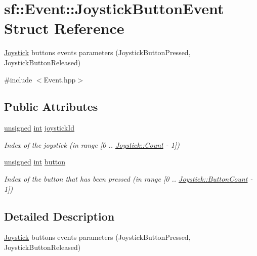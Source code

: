 \hypertarget{structsf_1_1_event_1_1_joystick_button_event}{\section{sf\-:\-:Event\-:\-:Joystick\-Button\-Event Struct Reference}
\label{structsf_1_1_event_1_1_joystick_button_event}
}


\hyperlink{classsf_1_1_joystick}{Joystick} buttons events parameters (Joystick\-Button\-Pressed, Joystick\-Button\-Released)  




{\ttfamily \#include $<$Event.\-hpp$>$}

\subsection*{Public Attributes}
\begin{DoxyCompactItemize}
\item 
\hyperlink{curses_8priv_8h_aca40206900cfc164654362fa8d4ad1e6}{unsigned} \hyperlink{term__entry_8h_ad65b480f8c8270356b45a9890f6499ae}{int} \hyperlink{structsf_1_1_event_1_1_joystick_button_event_a2f80ecdb964a5ae0fc30726a404c41ec}{joystick\-Id}
\begin{DoxyCompactList}\small\item\em Index of the joystick (in range \mbox{[}0 .. \hyperlink{classsf_1_1_joystick_aa49548ab614125923944b5d340f67a77a58bb2e8f3749310d61097e4361bc0ba8}{Joystick\-::\-Count} -\/ 1\mbox{]}) \end{DoxyCompactList}\item 
\hyperlink{curses_8priv_8h_aca40206900cfc164654362fa8d4ad1e6}{unsigned} \hyperlink{term__entry_8h_ad65b480f8c8270356b45a9890f6499ae}{int} \hyperlink{structsf_1_1_event_1_1_joystick_button_event_a6412e698a2f7904c5aa875a0d1b34da4}{button}
\begin{DoxyCompactList}\small\item\em Index of the button that has been pressed (in range \mbox{[}0 .. \hyperlink{classsf_1_1_joystick_aa49548ab614125923944b5d340f67a77a34b2a9c61551a32ea6f60004963c7252}{Joystick\-::\-Button\-Count} -\/ 1\mbox{]}) \end{DoxyCompactList}\end{DoxyCompactItemize}


\subsection{Detailed Description}
\hyperlink{classsf_1_1_joystick}{Joystick} buttons events parameters (Joystick\-Button\-Pressed, Joystick\-Button\-Released) 


